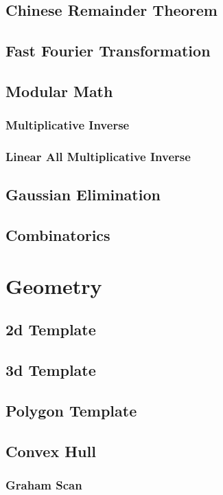\documentclass[10pt,a4paper]{report}
\begin{document}
	\section{Chinese Remainder Theorem}
	
	\newpage
	\section{Fast Fourier Transformation}
		
	
	\section{Modular Math}
		\subsection{Multiplicative Inverse}
		\subsection{Linear All Multiplicative Inverse}
	
	\section{Gaussian Elimination}
	
	\section{Combinatorics}
	
\chapter{Geometry}
	\section{2d Template}
	\section{3d Template}
	\section{Polygon Template}
	\section{Convex Hull}
		\subsection{Graham Scan}
\end{document}
